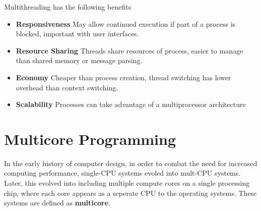\documentclass{book}
\begin{document}
            Multithreading has the following benefits
            \begin{itemize}
                \item \textbf{Responsiveness}
                    \subitem May allow continued execution if part of a process is blocked, important with user interfaces.
                \item \textbf{Resource Sharing}
                    \subitem Threads share resources of process, easier to manage than shared memory or message parsing.
                \item \textbf{Economy}
                    \subitem Cheaper than process creation, thread switching has lower overhead than context switching.
                \item \textbf{Scalability}
                    \subitem Processes can take advantage of a multiprocessor architecture
            \end{itemize}
        \section{Multicore Programming}
            In the early history of computer design, in order to combat the need for increased computing performance, single-CPU systems
            evoled into mult-CPU systems. Later, this evolved into including multiple compute cores on a single processing chip, where each core
            appears as a seperate CPU to the operating systems. These systems are defined as \textbf{multicore}.
\end{document}
